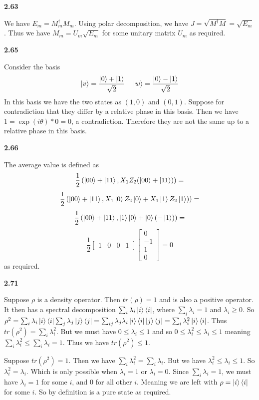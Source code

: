 \textbf{2.63}

We have $E_m = M^\dag_m M_m$. Using polar decomposition, we have $J = \sqrt{M^\dag M} = \sqrt{E_m}$. Thus we have $M_m = U_m\sqrt{E_m}$ for some unitary matrix $U_m$ as required.

\textbf{2.65}

Consider the basis 
\[\ket{v} = \frac{\ket{0}+\ket{1}}{\sqrt{2}}\quad\ket{w} = \frac{\ket{0}-\ket{1}}{\sqrt{2}}\]
In this basis we have the two states as $ (1,0)$ and $(0,1)$. Suppose for contradiction that they differ by a relative phase in this basis. Then we have $ 1 = \exp(i\theta)*0 = 0$, a contradiction. Therefore they are not the same up to a relative phase in this basis. 

\textbf{2.66}

The average value is defined as \[\frac{1}{2}\left(\ket{00} + \ket{11}, X_1Z_2(\ket{00} + \ket{11})\right) =\]\[\frac{1}{2}\left(\ket{00} + \ket{11}, X_1\ket{0}Z_2\ket{0} + X_1\ket{1}Z_2\ket{1})\right) =\] \[\frac{1}{2}\left(\ket{00} + \ket{11}, \ket{1}\ket{0} + \ket{0}(-\ket{1})\right) =
\]
\[\frac{1}{2}\begin{bmatrix}
    1 & 0 & 0 & 1
\end{bmatrix}
\begin{bmatrix}
    0 \\ -1\\ 1\\ 0
\end{bmatrix} =
0\]
as required.

\textbf{2.71}

Suppose $\rho $ is a density operator. Then $tr(\rho) = 1$ and is also a positive operator. It then has a spectral decomposition $ \sum_i\lambda_i\ket{i}\bra{i}$, where $\sum_i\lambda_i = 1$ and $\lambda_i \geq 0$. So $\rho^2 = \sum_i\lambda_i\ket{i}\bra{i}\sum_j\lambda_j\ket{j}\bra{j} =\sum_{ij}\lambda_j\lambda_i\ket{i}\bra{i}\ket{j}\bra{j} = \sum_{i}\lambda_i^2\ket{i}\bra{i}$. Thus $ tr(\rho^2) = \sum_{i}\lambda_i^2$. But we must have $ 0\leq\lambda_i \leq1$ and so $0\leq\lambda_i^2\leq \lambda_i \leq 1$ meaning $\sum_i\lambda_i^2 \leq \sum_i\lambda_i =1$. Thus we have $ tr(\rho^2) \leq 1$.

Suppose $ tr(\rho^2) = 1$. Then we have $ \sum_i\lambda_i^2 = \sum_i \lambda_i$. But we have $ \lambda_i^2\leq\lambda_i \leq 1$. So $\lambda_i^2 = \lambda_i$. Which is only possible when $ \lambda_i = 1$ or $\lambda_i = 0$. Since $ \sum_i \lambda_i = 1$, we must have $ \lambda_i = 1$ for some $i$, and $0$ for all other $i$. Meaning we are left with $\rho = \ket{i}\bra{i}$ for some $i$. So by definition is a pure state as required.

